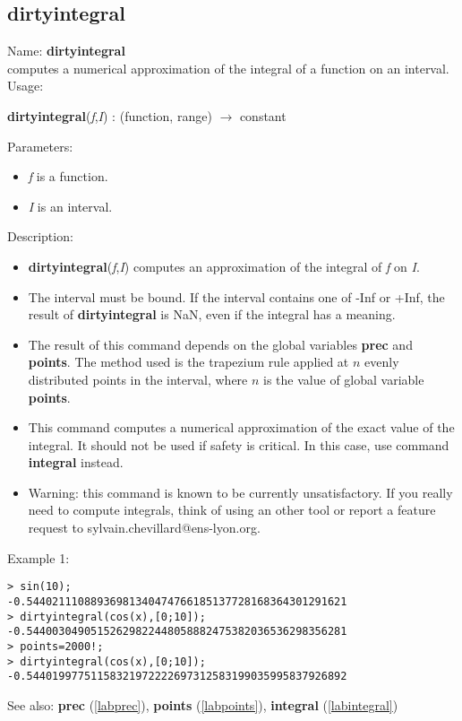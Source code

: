 \subsection{dirtyintegral}
\label{labdirtyintegral}
\noindent Name: \textbf{dirtyintegral}\\
computes a numerical approximation of the integral of a function on an interval.\\
\noindent Usage: 
\begin{center}
\textbf{dirtyintegral}(\emph{f},\emph{I}) : (\textsf{function}, \textsf{range}) $\rightarrow$ \textsf{constant}
\end{center}
Parameters: 
\begin{itemize}
\item \emph{f} is a function.
\item \emph{I} is an interval.
\end{itemize}
\noindent Description: \begin{itemize}

\item \textbf{dirtyintegral}(\emph{f},\emph{I}) computes an approximation of the integral of \emph{f} on \emph{I}.

\item The interval must be bound. If the interval contains one of -Inf or +Inf, the 
   result of \textbf{dirtyintegral} is NaN, even if the integral has a meaning.

\item The result of this command depends on the global variables \textbf{prec} and \textbf{points}.
   The method used is the trapezium rule applied at $n$ evenly distributed
   points in the interval, where $n$ is the value of global variable \textbf{points}.

\item This command computes a numerical approximation of the exact value of the 
   integral. It should not be used if safety is critical. In this case, use
   command \textbf{integral} instead.

\item Warning: this command is known to be currently unsatisfactory. If you really
   need to compute integrals, think of using an other tool or report a feature
   request to sylvain.chevillard@ens-lyon.org.
\end{itemize}
\noindent Example 1: 
\begin{center}\begin{minipage}{15cm}\begin{Verbatim}[frame=single]
> sin(10);
-0.54402111088936981340474766185137728168364301291621
> dirtyintegral(cos(x),[0;10]);
-0.54400304905152629822448058882475382036536298356281
> points=2000!;
> dirtyintegral(cos(x),[0;10]);
-0.54401997751158321972222697312583199035995837926892
\end{Verbatim}
\end{minipage}\end{center}
See also: \textbf{prec} (\ref{labprec}), \textbf{points} (\ref{labpoints}), \textbf{integral} (\ref{labintegral})
